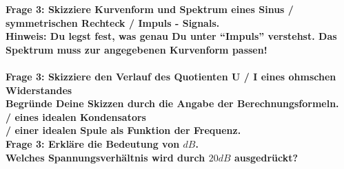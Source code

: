 \documentclass[11pt,a4paper]{scrartcl}
\begin{document}
\textbf{Frage 3: Skizziere Kurvenform und Spektrum eines Sinus / symmetrischen Rechteck / Impuls - Signals.\\
Hinweis: Du legst fest, was genau Du unter "`Impuls"' verstehst. Das Spektrum muss zur angegebenen Kurvenform passen!}\\
\\
\textbf{Frage 3: Skizziere den Verlauf des Quotienten U / I eines ohmschen Widerstandes}\\

\textbf{Begründe Deine Skizzen durch die Angabe der Berechnungsformeln.}\\

\textbf{/ eines idealen Kondensators} \\

\textbf{/ einer idealen Spule als Funktion der Frequenz.}\\


\textbf{Frage 3: Erkläre die Bedeutung von $dB$.}\\

\textbf{Welches Spannungsverhältnis wird durch $20dB$ ausgedrückt?}\\
\end{document}

